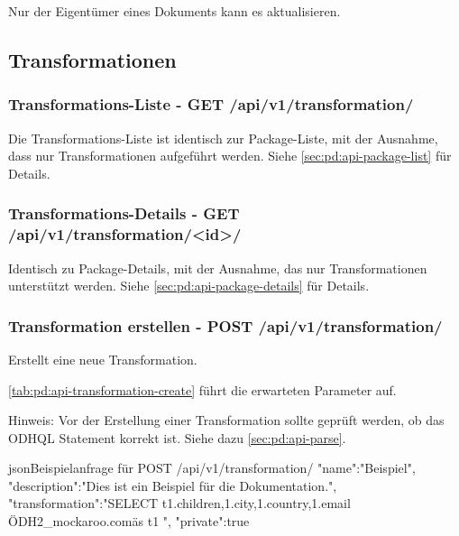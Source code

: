 Nur der Eigentümer eines Dokuments kann es aktualisieren.

\subsection{Transformationen}
\subsubsection{Transformations-Liste - GET /api/v1/transformation/}
Die Transformations-Liste ist identisch zur Package-Liste, mit der Ausnahme, dass nur Transformationen aufgeführt werden. Siehe \cref{sec:pd:api-package-list} für Details.

\subsubsection{Transformations-Details - GET /api/v1/transformation/<id>/}
Identisch zu Package-Details, mit der Ausnahme, das nur Transformationen unterstützt werden. Siehe \cref{sec:pd:api-package-details} für Details.

\subsubsection{Transformation erstellen - POST /api/v1/transformation/}
Erstellt eine neue Transformation.

\cref{tab:pd:api-transformation-create} führt die erwarteten Parameter auf.

Hinweis: Vor der Erstellung einer Transformation sollte geprüft werden, ob das ODHQL Statement korrekt ist. Siehe dazu \cref{sec:pd:api-parse}.

\begin{srclst}{json}{Beispielanfrage für POST /api/v1/transformation/}
{
  "name":"Beispiel",
  "description":"Dies ist ein Beispiel für die Dokumentation.",
  "transformation":"SELECT t1.children,\nt1.city,\nt1.country,\nt1.email \nFROM \"ODH2_mockaroo.com\" as t1 \n",
  "private":true
}
\end{srclst}

